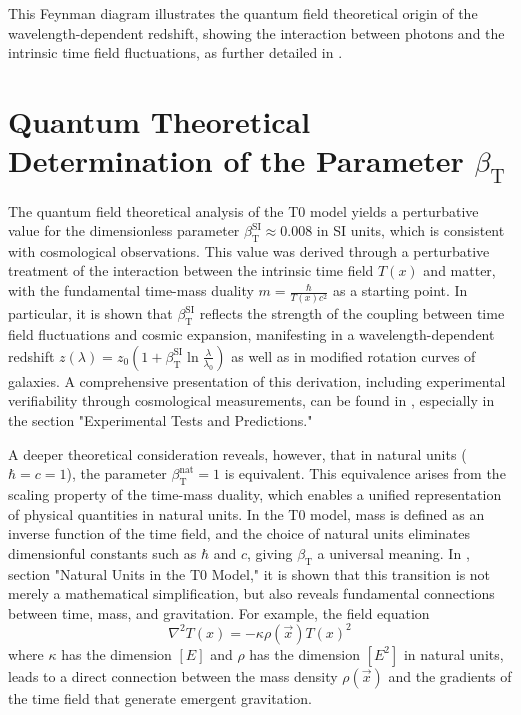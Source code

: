 \documentclass[12pt,a4paper]{article}
\newcommand{\Tfield}{T(x)}
\newcommand{\betaT}{\beta_{\text{T}}}
\newcommand{\vecx}{\vec{x}}
\begin{document}
	This Feynman diagram illustrates the quantum field theoretical origin of the wavelength-dependent redshift, showing the interaction between photons and the intrinsic time field fluctuations, as further detailed in \cite{pascher_feldtheorie_2025}.
	
	\section{Quantum Theoretical Determination of the Parameter \(\betaT\)}
	\label{sec:quantum_theoretical}
	
	The quantum field theoretical analysis of the T0 model yields a perturbative value for the dimensionless parameter \(\betaT^{\text{SI}} \approx 0.008\) in SI units, which is consistent with cosmological observations. This value was derived through a perturbative treatment of the interaction between the intrinsic time field \(\Tfield\) and matter, with the fundamental time-mass duality \(m = \frac{\hbar}{\Tfield c^2}\) as a starting point. In particular, it is shown that \(\betaT^{\text{SI}}\) reflects the strength of the coupling between time field fluctuations and cosmic expansion, manifesting in a wavelength-dependent redshift \(z(\lambda) = z_0 \left(1 + \betaT^{\text{SI}} \ln \frac{\lambda}{\lambda_0}\right)\) as well as in modified rotation curves of galaxies. A comprehensive presentation of this derivation, including experimental verifiability through cosmological measurements, can be found in \cite{pascher_emergente_gravitation_2025}, especially in the section "Experimental Tests and Predictions."
	
	A deeper theoretical consideration reveals, however, that in natural units (\(\hbar = c = 1\)), the parameter \(\betaT^{\text{nat}} = 1\) is equivalent. This equivalence arises from the scaling property of the time-mass duality, which enables a unified representation of physical quantities in natural units. In the T0 model, mass is defined as an inverse function of the time field, and the choice of natural units eliminates dimensionful constants such as \(\hbar\) and \(c\), giving \(\betaT\) a universal meaning. In \cite{pascher_emergente_gravitation_2025}, section "Natural Units in the T0 Model," it is shown that this transition is not merely a mathematical simplification, but also reveals fundamental connections between time, mass, and gravitation. For example, the field equation 
	\begin{equation}
		\nabla^2 \Tfield = -\kappa \rho(\vecx) \Tfield^2
	\end{equation}
	where \(\kappa\) has the dimension \([E]\) and \(\rho\) has the dimension \([E^2]\) in natural units, leads to a direct connection between the mass density \(\rho(\vecx)\) and the gradients of the time field that generate emergent gravitation.
	
\end{document}
